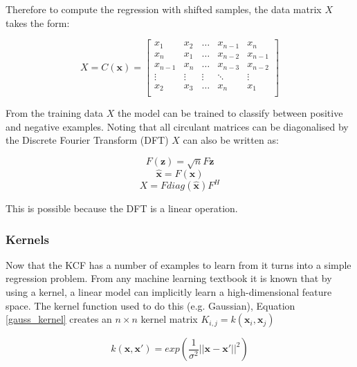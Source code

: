 \documentclass[11pt,twoside]{report}
\begin{document}
Therefore to compute the regression with shifted samples, the data matrix $X$ takes the form:

\begin{equation}
X = C(\mathbf{x}) = 
\begin{bmatrix}
x_{1} & x_{2} & \dots & x_{n-1} & x_{n} \\
x_{n} & x_{1} & \dots & x_{n-2}  & x_{n-1}  \\
x_{n-1} & x_{n} & \dots & x_{n-3} & x_{n-2}  \\
\vdots & \vdots & \vdots & \ddots & \vdots \\
x_{2}  & x_{3}  & \dots & x_{n} & x_{1} \\
\end{bmatrix}
\end{equation}

From the training data $X$ the model can be trained to classify between positive and negative examples. Noting that all circulant matrices can be diagonalised by the Discrete Fourier Transform (DFT) $X$ can also be written as:


\begin{equation}
\mathit{F}(\mathbf{z}) = \sqrt{n}F\mathbf{z}
\end{equation}
\begin{equation}
\hat{\mathbf{x}} = \mathit{F}(\mathbf{x})
\end{equation}
\begin{equation}
X = F diag(\hat{\mathbf{x}}) F^{H}
\end{equation}

This is possible because the DFT is a linear operation. 

\subsubsection{Kernels}\label{kcf_kernels}

Now that the KCF has a number of examples to learn from it turns into a simple regression problem. From any machine learning textbook it is known that by using a kernel, a linear model can implicitly learn a high-dimensional feature space. The kernel function used to do this (e.g. Gaussian), Equation \ref{gauss_kernel} creates an $n \times n$ kernel matrix $K_{i,j} = k(\mathbf{x}_{i},\mathbf{x}_{j})$

\begin{equation}
k(\mathbf{x},\mathbf{x}') = exp (\frac{1}{\sigma^{2}} ||\mathbf{x} - \mathbf{x}'||^{2})
\label{gauss_kernel}
\end{equation}
\end{document}
